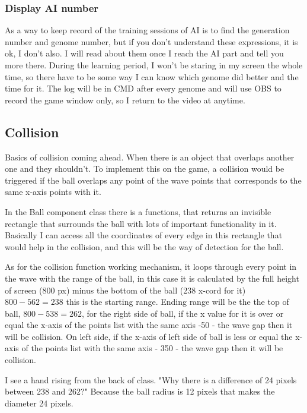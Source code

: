 \subsubsection{Display AI number}

As a way to keep record of the training sessions of AI is to find the generation number and genome number, but if you don't understand these expressions, it is ok, I don't also. I will read about them once I reach the AI part and tell you more there. During the learning period, I won't be staring in my screen the whole time, so there have to be some way I can know which genome did better and the time for it. The log will be in CMD after every genome and will use OBS to record the game window only, so I return to the video at anytime.

\subsection{Collision}\label{sec:collision}
Basics of collision coming ahead. When there is an object that overlaps another one and they shouldn't. To implement this on the game, a collision would be triggered if the ball overlaps any point of the wave points that corresponds to the same x-axis points with it.

In the Ball component class there is a  functions, that returns an invisible rectangle that surrounds the ball with lots of important functionality in it. Basically I can access all the coordinates of every edge in this rectangle that would help in the collision, and this will be the way of detection for the ball.

As for the collision function working mechanism, it loops through every point in the wave with the range of the ball, in this case it is  calculated by the full height of screen (800 px) minus the bottom of the ball (238 x-cord for it) $800-562 = 238$ this is the starting range. Ending range will be the the top of ball, $800-538 = 262$, for the right side of ball, if the x value for it is over or equal the x-axis of the points list with the same axis -50 - the wave gap then it will be collision. On left side, if the x-axis of left side of ball is less or equal the x-axis of the points list with the same axis - 350 - the wave gap then it will be collision. 

I see a hand rising from the back of class. "Why there is a difference of 24 pixels between 238 and 262?" Because the ball radius is 12 pixels that makes the diameter 24 pixels.


